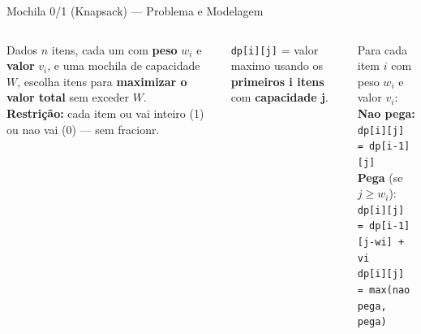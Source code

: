 \documentclass[aspectratio=169,10pt]{beamer}
\begin{document}
\begin{frame}{Mochila 0/1 (Knapsack) --- Problema e Modelagem}
  \begin{columns}[c]
      \begin{tcolorbox}[caixaAzul,title={Enunciado}]
        \small
        Dados $n$ itens, cada um com \textbf{peso} $w_i$
        e \textbf{valor} $v_i$, e uma mochila de
        capacidade $W$, escolha itens para
        \textbf{maximizar o valor total}
        sem exceder $W$.\\[4pt]
        \textbf{Restrição:} cada item ou vai inteiro
        (1) ou nao vai (0) --- sem fracionr.
      \end{tcolorbox}
      \vspace{0.10cm}
      \begin{tcolorbox}[caixaDP,title={Estado}]
        \footnotesize
        \texttt{dp[i][j]} = valor maximo usando
        os \textbf{primeiros i itens} com
        \textbf{capacidade j}.
      \end{tcolorbox}
      \vspace{0.10cm}
      \begin{tcolorbox}[caixaTeal,title={Transição}]
        \footnotesize
        Para cada item $i$ com peso $w_i$ e valor $v_i$:\\[3pt]
        \textbf{Nao pega:} \texttt{dp[i][j] = dp[i-1][j]}\\
        \textbf{Pega} (se $j \geq w_i$):\\
        \texttt{dp[i][j] = dp[i-1][j-wi] + vi}\\[3pt]
        \texttt{dp[i][j] = max(nao pega, pega)}
      \end{tcolorbox}
      \centering
\end{columns}
\end{frame}
\end{document}

